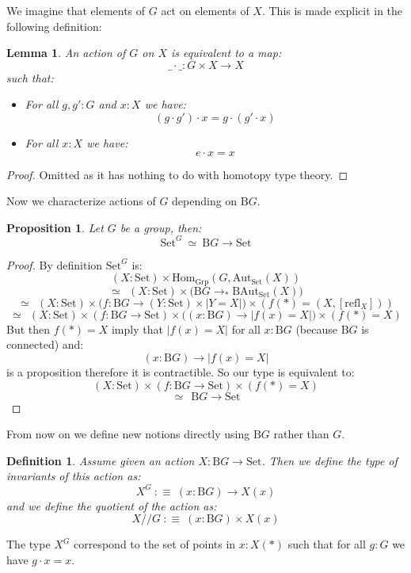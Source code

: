 \documentclass{article}
\renewcommand{\r}{\rightarrow}
\newcommand{\refl}{\mathrm{refl}}
\newcommand{\Grp}{\mathrm{Grp}}
\newcommand{\Hom}{\mathrm{Hom}}
\newcommand{\B}{\mathrm{B}}
\newcommand{\Aut}{\mathrm{Aut}}
\newcommand{\Set}{\mathrm{Set}}
\newtheorem{lemma}{Lemma}
\newtheorem{definition}{Definition}
\newtheorem{proposition}{Proposition}
\begin{document}
We imagine that elements of $G$ act on elements of $X$. This is made explicit in the following definition:

\begin{lemma}
An action of $G$ on $X$ is equivalent to a map:
\[\_\cdot\_ : G\times X \r X\]
such that:
\begin{itemize}
\item For all $g,g':G$ and $x:X$ we have:
\[(g\cdot g')\cdot x = g\cdot (g'\cdot x)\]
\item For all $x:X$ we have:
\[e\cdot x = x\]
\end{itemize} 
\end{lemma}
\begin{proof}
Omitted as it has nothing to do with homotopy type theory.
\end{proof}

Now we characterize actions of $G$ depending on $\B G$.

\begin{proposition}
Let $G$ be a group, then:
\[\Set^G \ \simeq \ \B G\r \Set\]
\end{proposition}
\begin{proof}
By definition $\Set^G$ is:
\[(X:\Set)\times \Hom_\Grp(G,\Aut_\Set(X))\]
\[\simeq \ \ (X:\Set)\times \big(\B G \r_*\B\Aut_\Set(X)\big)\]
\[\simeq \ \ (X:\Set)\times \big(f : \B G \r (Y:\Set)\times |Y=X|\big) \times (f(*) = (X,[\refl_X]))\]
\[\simeq \ \ (X:\Set)\times (f : \B G \r \Set)\times \big((x:\B G) \r |f(x) = X|\big) \times (f(*) = X)\]
But then $f(*) = X$ imply that $|f(x) = X|$ for all $x:\B G$ (because $\B G$ is connected) and:
\[(x:\B G) \r |f(x) = X|\]
 is a proposition therefore it is contractible. So our type is equivalent to:
\[(X:\Set)\times (f : \B G \r \Set)\times (f(*) = X)\]
\[\simeq \ \ \B G\r \Set\]
\end{proof}

From now on we define new notions directly using $\B G$ rather than $G$.

\begin{definition}
Assume given an action $X:\B G\r \Set$. Then we define the type of invariants of this action as:
\[X^G \ :\equiv \ (x:\B G)\r X(x)\]
and we define the quotient of the action as:
\[X//G \ :\equiv\ (x:\B G)\times X(x)\]
\end{definition}

The type $X^G$ correspond to the set of points in $x:X(*)$ such that for all $g:G$ we have $g\cdot x = x$.%
\end{document}
